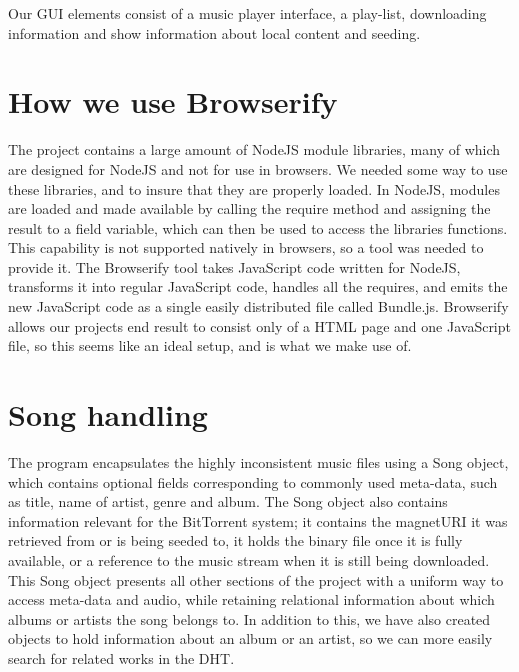 Our \acs{GUI} elements consist of a music player interface, a play-list, downloading information 
and show information about local content and seeding.
\newline

\section{How we use Browserify}
The project contains a large amount of NodeJS module libraries, 
many of which are designed for NodeJS and not for use in browsers.
We needed some way to use these libraries, and to insure that they are properly loaded.
In NodeJS, modules are loaded and made available by calling the require method 
and assigning the result to a field variable, which can then be used to access the libraries functions.
This capability is not supported natively in browsers, so a tool was needed to provide it.
The Browserify tool takes JavaScript code written for NodeJS, 
transforms it into regular JavaScript code, 
handles all the requires, 
and emits the new JavaScript code as a single easily distributed file called Bundle.js.
Browserify allows our projects end result to consist only of a \acs{HTML} page and one JavaScript file, 
so this seems like an ideal setup, and is what we make use of.
\newline

\section{Song handling}
The program encapsulates the highly inconsistent music files using a Song object,
which contains optional fields corresponding to commonly used meta-data, 
such as title, name of artist, genre and album. 
The Song object also contains information relevant for the BitTorrent system; 
it contains the magnetURI it was retrieved from or is being seeded to, 
it holds the binary file once it is fully available, 
or a reference to the music stream when it is still being downloaded.
This Song object presents all other sections of the project with a uniform way to access meta-data and audio, 
while retaining relational information about which albums or artists the song belongs to. In addition to this, 
we have also created objects to hold information about an album or an artist, 
so we can more easily search for related works in the \acs{DHT}.
\newline

